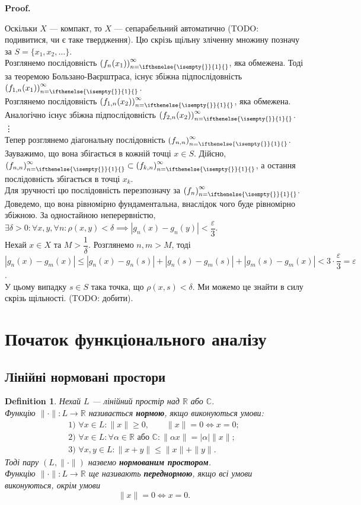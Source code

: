 \documentclass[a4paper, 10pt]{article}
\makeatletter
\theoremstyle{theoremdd}
\theoremstyle{theoremdd}
\newtheorem{definition}[theorem]{Definition}
\theoremstyle{theoremdd}
\theoremstyle{theoremdd}
\theoremstyle{theoremdd}
\theoremstyle{theoremdd}
\theoremstyle{theoremdd}
\theoremstyle{theoremdd}
\newcommand{\sequence}[2][]{\left({#2}\right)_{n=\ifthenelse{\isempty{#1}}{1}{#1}}^{\infty}}
\renewenvironment{proof}[1][Proof.\\]{\par
\pushQED{\hfill \qed}%
\normalfont \topsep6\p@\@plus6\p@\relax
\trivlist
\item\relax
{\bfseries
#1\@addpunct{.}}\hspace\labelsep\ignorespaces
}{%
\popQED\endtrivlist\@endpefalse
}
\makeatother
\begin{document}
\begin{proof}
Оскільки $X$ --- компакт, то $X$ --- сепарабельний автоматично (TODO: подивитися, чи є таке твердження). Цю скрізь щільну зліченну множину позначу за $S = \{x_1,x_2,\dots\}$.\\
Розглянемо послідовність $\sequence{f_n(x_1)}$, яка обмежена. Тоді за теоремою Бользано-Ваєрштраса, існує збіжна підпослідовність $\sequence{f_{1,n}(x_1)}$.\\
Розглянемо послідовність $\sequence{f_{1,n}(x_2)}$, яка обмежена. Аналогічно існує збіжна підпослідовність $\sequence{f_{2,n}(x_2)}$.\\
\vdots \\
Тепер розглянемо діагональну послідовність $\sequence{f_{n,n}}$. Зауважимо, що вона збігається в кожній точці $x \in S$. Дійсно, $\sequence{f_{n,n}} \subset \sequence{f_{k,n}}$, а остання послідовність збігається в точці $x_k$.
\bigskip \\
Для зручності цю послідовність перезпозначу за $\sequence{f_n}$. Доведемо, що вона рівномірно фундаментальна, внаслідок чого буде рівномірно збіжною. За одностайною неперервністю, $\exists \delta > 0: \forall x,y, \forall n: \rho(x,y) < \delta \implies |g_n(x) - g_n(y)| < \dfrac{\varepsilon}{3}$.\\
Нехай $x \in X$ та $M > \dfrac{1}{\delta}$. Розглянемо $n,m > M$, тоді\\
$|g_n(x) - g_m(x)| \leq |g_n(x) - g_n(s)| + |g_n(s) - g_m(s)| + |g_m(s) - g_m(x)| < 3 \cdot \dfrac{\varepsilon}{3} = \varepsilon$.\\
У цьому випадку $s \in S$ така точка, що $\rho(x,s) < \delta$. Ми можемо це знайти в силу скрізь щільності.
(TODO: добити).
\end{proof}
\newpage

\section{Початок функціонального аналізу}
\subsection{Лінійні нормовані простори}
\begin{definition}
Нехай $L$ --- лінійний простір над $\mathbb{R}$ або $\mathbb{C}$.\\
Функцію $\| \cdot \| \colon L \to \mathbb{R}$ називається \textbf{нормою}, якщо виконуються умови:
\begin{align*}
\text{1) } \forall x \in L: \|x\| \geq 0, \qquad \|x\| = 0 \iff x = 0; \\
\text{2) } \forall x \in L: \forall \alpha \in \mathbb{R} \text{ або } \mathbb{C}: \|\alpha x\| = |\alpha| \|x\|; \\
\text{3) } \forall x,y \in L: \|x+y\| \leq \|x\| + \|y\|.
\end{align*}
Тоді пару $(L, \|\cdot \|)$ назвемо \textbf{нормованим простором}.\\
Функцію $\| \cdot \| \colon L \to \mathbb{R}$ ще називають \textbf{переднормою}, якщо всі умови виконуються, окрім умови
\[
\|x\| = 0 \iff x = 0.
\]
\end{definition}
\end{document}
